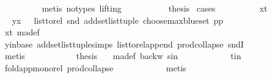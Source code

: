 \begin{isabellebody}
\ \ \ \ \ \ \ \ \isamarkupfalse%
\ {\isacharparenleft}{\kern0pt}metis\ {\isacharparenleft}{\kern0pt}no{\isacharunderscore}{\kern0pt}types{\isacharcomma}{\kern0pt}\ lifting{\isacharparenright}{\kern0pt}{\isacharparenright}{\kern0pt}\ \isanewline
\ \ \ \ \ \ \isamarkupfalse%
\ \isamarkupfalse%
\ {\isacharquery}{\kern0pt}thesis\ \isamarkupfalse%
{\isacharparenleft}{\kern0pt}cases{\isacharparenright}{\kern0pt}\isanewline
\ \ \ \ \ \ \ \ \isamarkupfalse%
\ x{\isacharunderscore}{\kern0pt}t\isanewline
\ \ \ \ \ \ \ \ \isamarkupfalse%
\ \isamarkupfalse%
\ {\isachardoublequoteopen}{\isacharparenleft}{\kern0pt}y{\isacharcomma}{\kern0pt}x{\isacharparenright}{\kern0pt}\ {\isasymin}\ \ list{\isacharunderscore}{\kern0pt}to{\isacharunderscore}{\kern0pt}rel\ {\isacharparenleft}{\kern0pt}snd\ {\isacharparenleft}{\kern0pt}add{\isacharunderscore}{\kern0pt}set{\isacharunderscore}{\kern0pt}list{\isacharunderscore}{\kern0pt}tuple\ {\isacharparenleft}{\kern0pt}choose{\isacharunderscore}{\kern0pt}max{\isacharunderscore}{\kern0pt}blue{\isacharunderscore}{\kern0pt}set\ pp{\isacharparenright}{\kern0pt}{\isacharparenright}{\kern0pt}{\isacharparenright}{\kern0pt}{\isachardoublequoteclose}\isanewline
\ \ \ \ \ \ \ \ \ \ \isamarkupfalse%
\ x{\isacharunderscore}{\kern0pt}t\ ma{\isacharunderscore}{\kern0pt}def\ \isanewline
\ \ \ \ \ \ \ \ \ \ \isamarkupfalse%
\ y{\isacharunderscore}{\kern0pt}in{\isacharunderscore}{\kern0pt}base\ add{\isacharunderscore}{\kern0pt}set{\isacharunderscore}{\kern0pt}list{\isacharunderscore}{\kern0pt}tuple{\isachardot}{\kern0pt}simps\ list{\isacharunderscore}{\kern0pt}to{\isacharunderscore}{\kern0pt}rel{\isacharunderscore}{\kern0pt}append\ prod{\isachardot}{\kern0pt}collapse\ sndI\isanewline
\ \ \ \ \ \ \ \ \ \ \isamarkupfalse%
\ metis\isanewline
\ \ \ \ \ \ \ \ \isamarkupfalse%
\ \isamarkupfalse%
\ {\isacharquery}{\kern0pt}thesis\ \isamarkupfalse%
\ \ ma{\isacharunderscore}{\kern0pt}def\ backw\ s{\isacharunderscore}{\kern0pt}in\isanewline
\ \ \ \ \ \ \ \ \ \ \isamarkupfalse%
\ t{\isacharunderscore}{\kern0pt}in\ \isanewline
\ \ \ \ \ \ \ \ \ \ \isamarkupfalse%
\ fold{\isacharunderscore}{\kern0pt}app{\isacharunderscore}{\kern0pt}mono{\isacharunderscore}{\kern0pt}rel\ prod{\isachardot}{\kern0pt}collapse\isanewline
\ \ \ \ \ \ \ \ \ \ \isamarkupfalse%
\ metis\ \ \ \ \ \isanewline
\ \ \ \ \ \ \isamarkupfalse%

\end{isabellebody}
